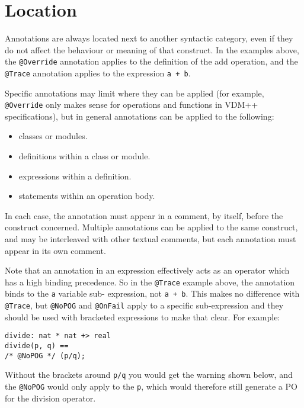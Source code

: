 \section{Location}

Annotations are always located next to another syntactic category,
even if they do not affect the behaviour or meaning of that
construct. In the examples above, the
\lstinline[language=VDM++]|@Override| annotation applies to the
definition of the add operation, and the
\lstinline[language=VDM++]|@Trace| annotation applies to the
expression \lstinline[language=VDM++]|a + b|.

Specific annotations may limit where they can be applied (for example,
\lstinline[language=VDM++]|@Override| only makes sense for operations
and functions in VDM++ specifications), but in general annotations can
be applied to the following:

\begin{itemize}
  \item classes or modules.
  \item definitions within a class or module.
  \item expressions within a definition.
  \item statements within an operation body.
\end{itemize}

In each case, the annotation must appear in a comment, by itself,
before the construct concerned. Multiple annotations can be applied to
the same construct, and may be interleaved with other textual
comments, but each annotation must appear in its own comment.

Note that an annotation in an expression effectively acts as an
operator which has a high binding precedence. So in the
\lstinline[language=VDM++]|@Trace| example above, the annotation binds
to the \lstinline[language=VDM++]|a| variable sub- expression, not
\lstinline[language=VDM++]|a + b|. This makes no difference with
\lstinline[language=VDM++]|@Trace|, but
\lstinline[language=VDM++]|@NoPOG| and
\lstinline[language=VDM++]|@OnFail| apply to a specific sub-expression
and they should be used with bracketed expressions to make that
clear. For example:

\begin{lstlisting}[language=VDM++, frame=tlbr]
divide: nat * nat +> real
divide(p, q) ==
/* @NoPOG */ (p/q);
\end{lstlisting}

Without the brackets around \lstinline[language=VDM++]|p/q| you
would get the warning shown below, and the
\lstinline[language=VDM++]|@NoPOG| would only apply to the
\lstinline[language=VDM++]|p|, which would therefore
still generate a PO for the division operator.\\

